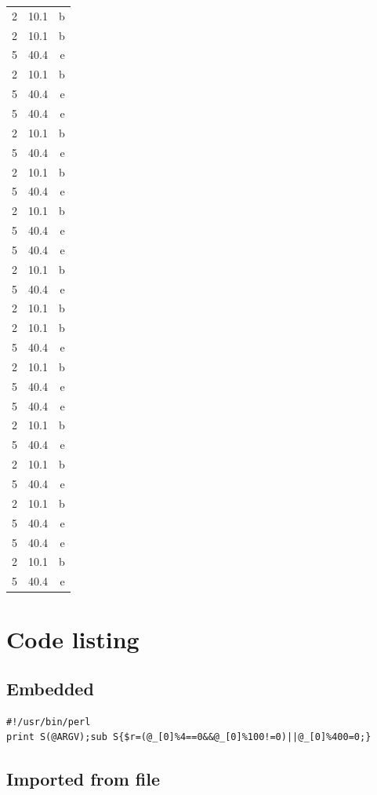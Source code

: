 \documentclass{article}
\begin{document}
\begin{longtable}[c]{l|S|r}
	2 & 10.1 & b \\ 
	2 & 10.1 & b \\ 
	5 & 40.4 & e \\ 
	2 & 10.1 & b \\ 
	5 & 40.4 & e \\ 
	5 & 40.4 & e \\ 
	2 & 10.1 & b \\ 
	5 & 40.4 & e \\ 
	2 & 10.1 & b \\ 
	5 & 40.4 & e \\ 
	2 & 10.1 & b \\ 
	5 & 40.4 & e \\ 
	5 & 40.4 & e \\ 
	2 & 10.1 & b \\ 
	5 & 40.4 & e \\ 
	2 & 10.1 & b \\ 
	2 & 10.1 & b \\ 
	5 & 40.4 & e \\ 
	2 & 10.1 & b \\ 
	5 & 40.4 & e \\ 
	5 & 40.4 & e \\ 
	2 & 10.1 & b \\ 
	5 & 40.4 & e \\ 
	2 & 10.1 & b \\ 
	5 & 40.4 & e \\ 
	2 & 10.1 & b \\ 
	5 & 40.4 & e \\ 
	5 & 40.4 & e \\ 
	2 & 10.1 & b \\ 
	5 & 40.4 & e \\ 
	\bottomrule
    \end{longtable}

    \newpage

    \section{Code listing}
    \subsection{Embedded}

    \begin{lstlisting}
#!/usr/bin/perl
print S(@ARGV);sub S{$r=(@_[0]%4==0&&@_[0]%100!=0)||@_[0]%400=0;}
    \end{lstlisting}

    \subsection{Imported from file}

    

    \newpage
    
    \begin{appendix}
	\listoffigures
	\listoftables
    \end{appendix}
\end{document}
